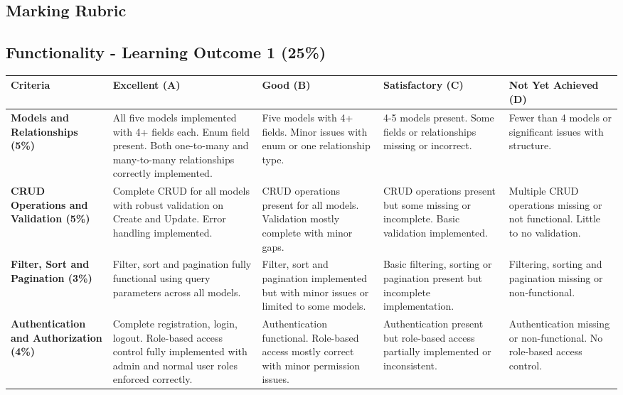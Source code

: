 \documentclass{article}
\begin{document}
\begin{landscape}

\section*{Marking Rubric}

\subsection*{Functionality - Learning Outcome 1 (25\%)}

\renewcommand{\arraystretch}{1.3}
\begin{tabular}{|p{5cm}|p{4cm}|p{4cm}|p{4cm}|p{4cm}|}
\hline
\textbf{Criteria} & \textbf{Excellent (A)} & \textbf{Good (B)} & \textbf{Satisfactory (C)} & \textbf{Not Yet Achieved (D)} \\ \hline

\textbf{Models and Relationships (5\%)} & 
All five models implemented with 4+ fields each. Enum field present. Both one-to-many and many-to-many relationships correctly implemented. & 
Five models with 4+ fields. Minor issues with enum or one relationship type. & 
4-5 models present. Some fields or relationships missing or incorrect. & 
Fewer than 4 models or significant issues with structure. \\ \hline

\textbf{CRUD Operations and Validation (5\%)} & 
Complete CRUD for all models with robust validation on Create and Update. Error handling implemented. & 
CRUD operations present for all models. Validation mostly complete with minor gaps. & 
CRUD operations present but some missing or incomplete. Basic validation implemented. & 
Multiple CRUD operations missing or not functional. Little to no validation. \\ \hline

\textbf{Filter, Sort and Pagination (3\%)} & 
Filter, sort and pagination fully functional using query parameters across all models. & 
Filter, sort and pagination implemented but with minor issues or limited to some models. & 
Basic filtering, sorting or pagination present but incomplete implementation. & 
Filtering, sorting and pagination missing or non-functional. \\ \hline

\textbf{Authentication and Authorization (4\%)} & 
Complete registration, login, logout. Role-based access control fully implemented with admin and normal user roles enforced correctly. & 
Authentication functional. Role-based access mostly correct with minor permission issues. & 
Authentication present but role-based access partially implemented or inconsistent. & 
Authentication missing or non-functional. No role-based access control. \\ \hline


\end{tabular}
\end{landscape}
\end{document}
